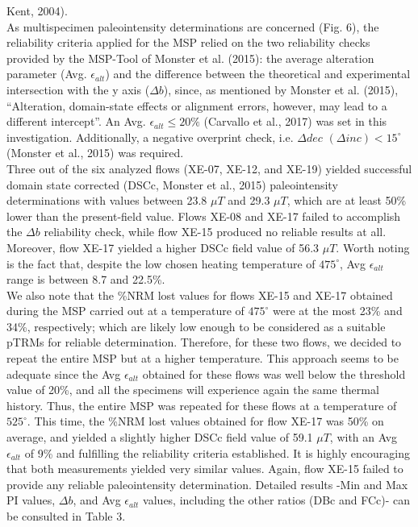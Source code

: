 \documentclass[review]{elsarticle}
\begin{document}
Kent, 2004).
\\
As multispecimen paleointensity determinations are concerned (Fig. 6), the reliability criteria applied for the MSP relied on the two reliability checks provided by the MSP-Tool of Monster et al. (2015): the average alteration parameter (Avg. $\epsilon_{alt}$) and the difference between the theoretical and experimental intersection with the y axis ($\Delta b$), since, as mentioned by Monster et al. (2015), “Alteration, domain-state effects or alignment errors, however, may lead to a different intercept”. An Avg.  $\epsilon_{alt} \leq 20\%$  (Carvallo et al., 2017) was set in this investigation. Additionally, a negative overprint check, i.e. $\Delta dec$ $(\Delta inc) < 15^{\circ}$ (Monster et al., 2015) was required.
\\
Three out of the six analyzed flows (XE-07, XE-12, and XE-19) yielded successful domain state corrected (DSCc, Monster et al., 2015) paleointensity determinations with values between 23.8  $\mu T$ and 29.3  $\mu T$, which are at least 50\% lower than the present-field value. Flows XE-08 and XE-17 failed to accomplish the $\Delta b$ reliability check, while flow XE-15 produced no reliable results at all. Moreover, flow XE-17 yielded a higher DSCc field value of 56.3 $\mu T$. Worth noting is the fact that, despite the low chosen heating temperature of $475^{\circ}$, Avg $\epsilon_{alt}$ range is between 8.7 and 22.5\%.
\\
We also note that the \%NRM lost values for flows XE-15 and XE-17 obtained during the MSP carried out at a temperature of $475^{\circ}$ were at the most 23\% and 34\%, respectively; which are likely low enough to
be considered as a suitable pTRMs for reliable determination. Therefore, for these two flows, we decided to repeat the entire MSP but at a higher temperature. This approach seems to be adequate since the Avg $\epsilon_{alt}$ obtained for these flows was well below the threshold value of 20\%, and all the specimens will experience again the same thermal history. Thus, the entire MSP was repeated for these flows at a temperature of $525^{\circ}$. This time, the \%NRM lost values obtained for flow XE-17 was 50\% on average, and yielded a slightly higher DSCc field value of 59.1 $\mu T$, with an Avg $\epsilon_{alt}$ of 9\% and fulfilling the reliability criteria established. It is highly encouraging that both measurements yielded very similar values. Again, flow XE-15 failed to provide any reliable paleointensity determination. Detailed results -Min and Max PI values, $\Delta b$, and Avg $\epsilon_{alt}$ values, including the other ratios (DBc and FCc)- can be consulted in Table 3.
\end{document}
